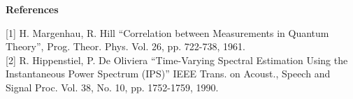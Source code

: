 {\bf \large {}\selectfont References}\\
\hspace*{1.5cm}
\begin{minipage}[t]{13.5cm}
[1] H. Margenhau, R. Hill ``Correlation between Measurements in Quantum
Theory'', Prog. Theor. Phys. Vol. 26, pp. 722-738, 1961.\\

[2] R. Hippenstiel, P. De Oliviera ``Time-Varying Spectral Estimation Using
the Instantaneous Power Spectrum (IPS)'' IEEE Trans. on Acoust., Speech and
Signal Proc. Vol. 38, No. 10, pp. 1752-1759, 1990.
\end{minipage}

